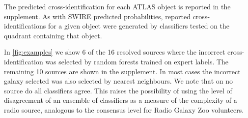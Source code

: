 \documentclass[fleqn,usenatbib,usedcolumn]{mnras}
\begin{document}
    The predicted cross-identification for each ATLAS object is reported in
    the supplement. As with SWIRE predicted probabilities, reported
    cross-identifications for a given object were generated by classifiers
    tested on the quadrant containing that object.

    In \autoref{fig:examples} we show 6 of the 16 resolved sources where the incorrect cross-identification was selected by random forests trained on expert labels. The remaining 10 sources are shown in the supplement. In most cases the incorrect galaxy selected was also selected by nearest neighbours. We note that on no source do all classifiers agree. This raises the possibility of using the level of disagreement of an ensemble of classifiers as a measure of the complexity of a radio source, analogous to the consensus level for Radio Galaxy Zoo volunteers.
\end{document}
